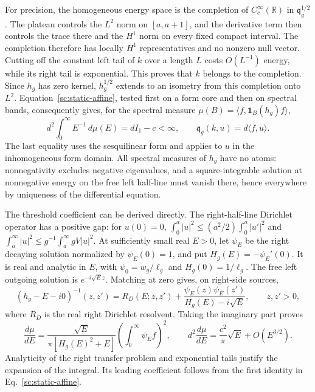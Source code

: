 \documentclass[aps,prl,reprint,superscriptaddress,longbibliography]{revtex4-2}
\begin{document}
For precision, the homogeneous energy space is the completion of
$C_c^\infty(\mathbb R)$ in $\mathfrak q_g^{1/2}$. The plateau controls the
$L^2$ norm on $[a,a+1]$, and the derivative term then controls the trace
there and the $H^1$ norm on every fixed compact interval. The completion
therefore has locally $H^1$ representatives and no nonzero null vector.
Cutting off the constant left tail of $k$ over a length $L$ costs
$O(L^{-1})$ energy, while its right tail is exponential. This proves
that $k$ belongs to the completion. Since $h_g$ has zero kernel,
$h_g^{1/2}$ extends to an isometry from this completion onto $L^2$.
Equation~\eqref{sc:static-affine}, tested first on a form core and then
on spectral bands, consequently gives, for the spectral measure
$\mu(B)=\langle f,\mathbf1_B(h_g)f\rangle$,
\begin{equation}
 d^2\int_0^\infty E^{-1}\,d\mu(E)=dI_1-c<\infty,
 \qquad \mathfrak q_g(k,u)=d\langle f,u\rangle.
 \label{sc:inverse-moment}
\end{equation}
The last equality uses the sesquilinear form and applies to $u$ in the
inhomogeneous form domain. All spectral measures of $h_g$ have no atoms:
nonnegativity excludes negative eigenvalues, and a square-integrable
solution at nonnegative energy on the free left half-line must vanish
there, hence everywhere by uniqueness of the differential equation.

The threshold coefficient can be derived directly. The right-half-line
Dirichlet operator has a positive gap: for $u(0)=0$,
$\int_0^a|u|^2\le(a^2/2)\int_0^a|u'|^2$ and
$\int_a^\infty|u|^2\le g^{-1}\int_a^\infty gV|u|^2$.
At sufficiently small real $E>0$, let $\psi_E$ be the right decaying
solution normalized by $\psi_E(0)=1$, and put $H_g(E)=-\psi_E'(0)$.
It is real and analytic in $E$, with
$\psi_0=w_g/\ell_g$ and $H_g(0)=1/\ell_g$. The free left outgoing
solution is $e^{-i\sqrt E z}$. Matching at zero gives, on right-side sources,
\begin{equation}
 (h_g-E-i0)^{-1}(z,z')
 =R_D(E;z,z')+
 \frac{\psi_E(z)\psi_E(z')}{H_g(E)-i\sqrt E},
 \qquad z,z'>0,
 \label{sc:resolvent-match}
\end{equation}
where $R_D$ is the real right Dirichlet resolvent. Taking the imaginary
part proves
\begin{equation}
 \frac{d\mu}{dE}
 =\frac{\sqrt E}{\pi[H_g(E)^2+E]}
   \left(\int_0^\infty\psi_E f\right)^2,
 \qquad
 d^2\frac{d\mu}{dE}=\frac{c^2}{\pi}\sqrt E+O(E^{3/2}).
 \label{sc:threshold}
\end{equation}
Analyticity of the right transfer problem and exponential tails justify
the expansion of the integral. Its leading coefficient follows from
the first identity in Eq.~\eqref{sc:static-affine}.
\end{document}
